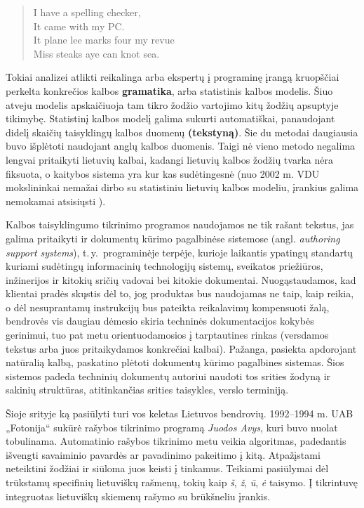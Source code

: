 \begin{multicols}{2}
\begin{quote}
  I have a spelling checker,\\
  It came with my PC.\\
  It plane lee marks four my revue\\
  Miss steaks aye can knot sea.
\end{quote}

Tokiai analizei atlikti reikalinga arba ekspertų į programinę įrangą kruopščiai perkelta konkrečios kalbos \textbf{gramatika}, arba statistinis kalbos modelis. Šiuo atveju modelis apskaičiuoja tam tikro žodžio vartojimo kitų žodžių apsuptyje tikimybę. Statistinį kalbos modelį galima sukurti automatiškai, panaudojant didelį skaičių taisyklingų kalbos duomenų \textbf{(tekstyną)}. Šie du metodai daugiausia buvo išplėtoti naudojant anglų kalbos duomenis. Taigi nė vieno metodo negalima lengvai pritaikyti lietuvių kalbai, kadangi lietuvių kalbos žodžių tvarka nėra fiksuota, o kaitybos sistema yra kur kas sudėtingesnė (nuo 2002 m. VDU mokslininkai nemažai dirbo su statistiniu lietuvių kalbos modeliu, įrankius galima nemokamai atsisiųsti \cite{airenas}).   


Kalbos taisyklingumo tikrinimo programos naudojamos ne tik rašant tekstus, jas galima pritaikyti ir dokumentų kūrimo pagalbinėse sistemose (angl. \textit{authoring support systems}), t.\,y.~programinėje terpėje, kurioje laikantis ypatingų standartų kuriami sudėtingų informacinių technologijų sistemų, sveikatos priežiūros, inžinerijos ir kitokių sričių vadovai bei kitokie dokumentai. Nuogąstaudamos, kad klientai pradės skųstis dėl to, jog produktas bus naudojamas ne taip, kaip reikia, o dėl nesuprantamų instrukcijų bus pateikta reikalavimų kompensuoti žalą, bendrovės vis daugiau dėmesio skiria techninės dokumentacijos kokybės gerinimui, tuo pat metu orientuodamosios į tarptautines rinkas (versdamos tekstus arba juos pritaikydamos konkrečiai kalbai). Pažanga, pasiekta apdorojant natūralią kalbą, paskatino plėtoti dokumentų kūrimo pagalbines sistemas. Šios sistemos padeda techninių dokumentų autoriui naudoti tos srities žodyną ir sakinių struktūras, atitinkančias srities taisykles, verslo terminiją.



Šioje srityje ką pasiūlyti turi vos keletas Lietuvos bendrovių. 1992–1994 m. UAB „Fotonija“ sukūrė rašybos tikrinimo programą \textit{Juodos Avys}, kuri buvo nuolat tobulinama. Automatinio rašybos tikrinimo metu veikia algoritmas, padedantis išvengti savaiminio pavardės ar pavadinimo pakeitimo į kitą. Atpažįstami neteiktini žodžiai ir siūloma juos keisti į tinkamus. Teikiami pasiūlymai dėl trūkstamų specifinių lietuviškų rašmenų, tokių kaip \textit{š}, \textit{ž},  \textit{ū}, \textit{ė} taisymo. Į tikrintuvę integruotas lietuviškų skiemenų rašymo su brūkšneliu įrankis.   


\end{multicols}
